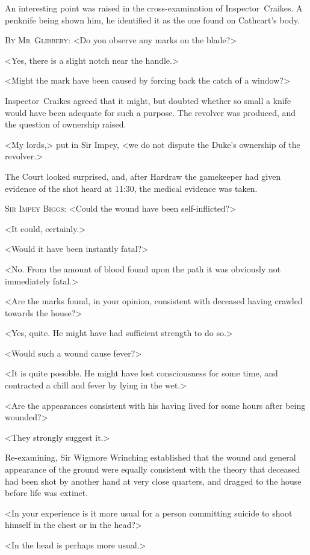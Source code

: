 An interesting point was raised in the cross-examination of Inspector~Craikes. A penknife being shown him, he identified it as the one found on Cathcart's body.

\textsc{By Mr~Glibbery}: <Do you observe any marks on the blade?>

<Yes, there is a slight notch near the handle.>

<Might the mark have been caused by forcing back the catch of a window?>

Inspector~Craikes agreed that it might, but doubted whether so small a knife would have been adequate for such a purpose. The revolver was produced, and the question of ownership raised.

<My lords,> put in Sir Impey, <we do not dispute the Duke's ownership of the revolver.>

The Court looked surprised, and, after Hardraw the gamekeeper had given evidence of the shot heard at 11:30, the medical evidence was taken.

\textsc{Sir Impey Biggs}: <Could the wound have been self-inflicted?>

<It could, certainly.>

<Would it have been instantly fatal?>

<No. From the amount of blood found upon the path it was obviously not immediately fatal.>

<Are the marks found, in your opinion, consistent with deceased having crawled towards the house?>

<Yes, quite. He might have had sufficient strength to do so.>

<Would such a wound cause fever?>

<It is quite possible. He might have lost consciousness for some time, and contracted a chill and fever by lying in the wet.>

<Are the appearances consistent with his having lived for some hours after being wounded?>

<They strongly suggest it.>

Re-examining, Sir Wigmore Wrinching established that the wound and general appearance of the ground were equally consistent with the theory that deceased had been shot by another hand at very close quarters, and dragged to the house before life was extinct.

<In your experience is it more usual for a person committing suicide to shoot himself in the chest or in the head?>

<In the head is perhaps more usual.>

